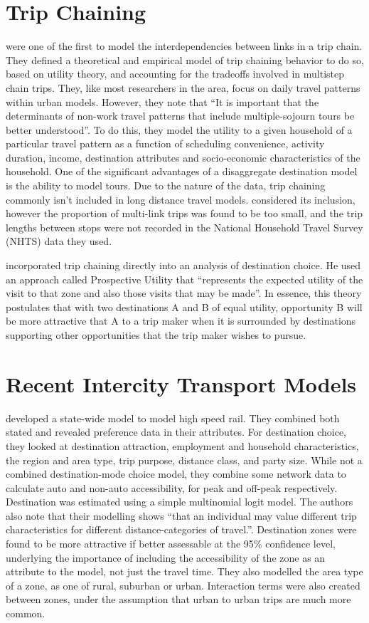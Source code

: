 \section{Trip Chaining}
\textcite{AdlerAkiva79} were one of the first to model the interdependencies between links in a trip chain. They defined a theoretical and empirical model of trip chaining behavior to do so, based on utility theory, and accounting for the tradeoffs involved in multistep chain trips. They, like most researchers in the area, focus on daily travel patterns within urban models. However, they note that \enquote{It is important that the determinants of non-work travel patterns that include multiple-sojourn tours be better understood}. To do this, they model the utility to a given household of a particular travel pattern as a function of scheduling convenience, activity duration, income, destination attributes and socio-economic characteristics of the household.
One of the significant advantages of a disaggregate destination model is the ability to model tours. Due to the nature of the data, trip chaining commonly isn't included in long distance travel models. \textcite{Moeckel15} considered its inclusion, however the proportion of multi-link trips was found to be too small, and the trip lengths between stops were not recorded in the National Household Travel Survey (NHTS) data they used. 

\textcite{Kitamura84} incorporated trip chaining directly into an analysis of destination choice. He used an approach called Prospective Utility that \enquote{represents the expected utility of the visit to that zone and also those visits that may be made}. In essence, this theory postulates that with two destinations A and B of equal utility, opportunity B will be more attractive that A to a trip maker when it is surrounded by destinations supporting other opportunities that the trip maker wishes to pursue.

\section{Recent Intercity Transport Models}
\autocite{Outwater10} developed a state-wide model to model high speed rail. They combined both stated and revealed preference data in their attributes. For destination choice, they looked at destination attraction, employment and household characteristics, the region and area type, trip purpose, distance class, and party size. While not a combined destination-mode choice model, they combine some network data to calculate auto and non-auto accessibility, for peak and off-peak respectively. Destination was estimated using a simple multinomial logit model. The authors also note that their modelling shows \enquote{that an individual may value different trip characteristics for different distance-categories of travel.}. Destination zones were found to be more attractive if better assessable at the 95\% confidence level, underlying the importance of including the accessibility of the zone as an attribute to the model, not just the travel time. They also modelled the area type of a zone, as one of rural, suburban or urban. Interaction terms were also created between zones, under the assumption that urban to urban trips are much more common.

